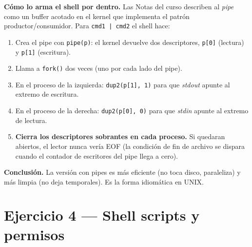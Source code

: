 \documentclass[11pt,a4paper]{article}
\begin{document}
\textbf{Cómo lo arma el shell por dentro.} Las Notas del curso
describen al \emph{pipe} como un buffer acotado en el kernel que
implementa el patrón productor/consumidor. Para \texttt{cmd1 | cmd2}
el shell hace:

\begin{enumerate}[leftmargin=*]
    \item Crea el pipe con \texttt{pipe(p)}: el kernel devuelve dos
        descriptores, \texttt{p[0]} (lectura) y \texttt{p[1]}
        (escritura).
    \item Llama a \texttt{fork()} dos veces (uno por cada lado del
        pipe).
    \item En el proceso de la izquierda: \texttt{dup2(p[1], 1)} para
        que \emph{stdout} apunte al extremo de escritura.
    \item En el proceso de la derecha: \texttt{dup2(p[0], 0)} para
        que \emph{stdin} apunte al extremo de lectura.
    \item \textbf{Cierra los descriptores sobrantes en cada proceso.}
        Si quedaran abiertos, el lector nunca vería EOF (la condición
        de fin de archivo se dispara cuando el contador de escritores
        del pipe llega a cero).
\end{enumerate}

\begin{center}
\end{center}

\textbf{Conclusión.} La versión con pipes es más eficiente (no toca
disco, paraleliza) y más limpia (no deja temporales). Es la forma
idiomática en UNIX.

\section{Ejercicio 4 --- Shell scripts y permisos}
\end{document}
